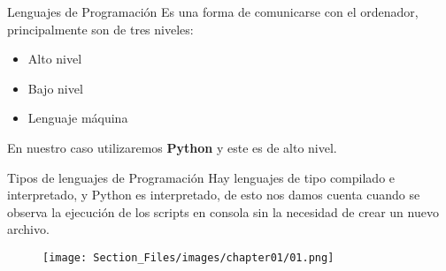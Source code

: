 \begin{frame}{Lenguajes de Programación}
\justifying
Es una forma de comunicarse con el ordenador, principalmente son de tres niveles:

\begin{itemize}
\item Alto nivel
\item Bajo nivel
\item Lenguaje máquina
\end{itemize}

En nuestro caso utilizaremos \textbf{Python} y este es de alto nivel.
\end{frame}

\begin{frame}{Tipos de lenguajes de Programación}
\justifying
Hay lenguajes de tipo compilado e interpretado, y Python es interpretado, de esto nos damos cuenta cuando se observa la ejecución de los scripts en consola sin la necesidad de crear un nuevo archivo.

\begin{figure}[H]
\centering
\texttt{[image: Section\_Files/images/chapter01/01.png]}
\end{figure}
\end{frame}